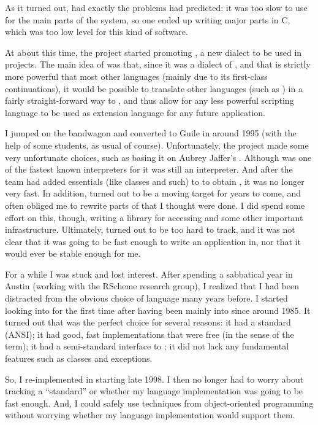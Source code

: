 As it turned out, {\elk} had exactly the problems {\rms} had
predicted: it was too slow to use for the main parts of the system, so
one ended up writing major parts in C, which was too low level for
this kind of software. 

At about this time, the {\gnu} project started promoting {\guile}, 
a new {\scheme} dialect to be used in {\gnu} projects.  The main idea
of {\guile} was that, since it was a dialect of {\scheme}, and that
{\scheme} is strictly more powerful that most other languages (mainly
due to its first-class continuations), it would be possible to
translate other languages (such as {\tcl}) in a fairly
straight-forward way to {\guile}, and thus allow for any less powerful
scripting language to be used as extension language for any future
{\gnu} application. 

I jumped on the {\guile} bandwagon and converted {\gs} to Guile in
around 1995 (with the help of some students, as usual of course).
Unfortunately, the {\guile} project made some very unfortunate
choices, such as basing it on Aubrey Jaffer's {\scm}.  Although {\scm}
was one of the fastest known interpreters for {\scheme} it was still
an interpreter.  And after the {\guile} team had added essentials
(like classes and such) to {\scm} to obtain {\guile}, it was no longer
very fast.  In addition, {\guile} turned out to be a moving target for
years to come, and often obliged me to rewrite parts of {\gs} that I
thought were done.  I did spend some effort on this, though, writing a
library for accessing {\xwin} and some other important
infrastructure.  Ultimately, {\guile} turned out to be too hard to
track, and it was not clear that it was going to be fast enough to
write an application in, nor that it would ever be stable enough for
me. 

For a while I was stuck and lost interest.  After spending a
sabbatical year in Austin (working with the RScheme research group), I
realized that I had been distracted from the obvious choice of
language many years before.  I started looking into {\commonlisp} for the
first time after having been mainly into {\scheme} since around 1985.
It turned out that {\commonlisp} was the perfect choice for several reasons:
it had a standard (ANSI); it had good, fast implementations that were
free (in the {\gnu} sense of the term); it had a semi-standard
interface to {\xwin}; it did not lack any fundamental features such as
classes and exceptions. 

So, I re-implemented {\gs} in {\commonlisp} starting late 1998.  I then no
longer had to worry about tracking a ``standard'' or whether my
language implementation was going to be fast enough.  And, I could
safely use techniques from object-oriented programming without
worrying whether my language implementation would support them. 

